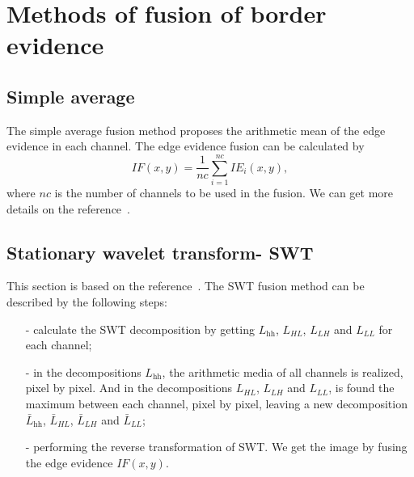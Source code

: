 \documentclass[conference]{IEEEtran}
\begin{document}
\section{Methods of fusion of border evidence}\label{sec_06}
\subsection{Simple average}
The simple average fusion method proposes the arithmetic mean of the edge evidence in each channel. The edge evidence fusion can be calculated by
\begin{equation}
	IF(x,y)=\frac{1}{nc}\sum_{i=1}^{nc}IE_i(x,y),
\end{equation}
where $nc$ is the number of channels to be used in the fusion. We can get more details on the reference~\cite{mit}.
\subsection{Stationary wavelet transform- SWT} 
This section is based on the reference~\cite{n_r}. The SWT fusion method can be described by the following steps:
\begin{itemize}
\item[-] calculate the SWT decomposition by getting $L_\text{hh}$, $L_{HL}$, $L_{LH}$ and $L_{LL}$ for each channel;
\item[-] in the decompositions $L_\text{hh}$, the arithmetic media of all channels is realized, pixel by pixel. And in the decompositions $L_{HL}$, $L_{LH}$ and $L_{LL}$, is found the maximum between each channel, pixel by pixel, leaving a new decomposition $\bar{L}_\text{hh}$, $\bar{L}_{HL}$, $\bar{L}_{LH}$ and $\bar{L}_{LL}$;
\item[-] performing the reverse transformation of SWT. We get the image by fusing the edge evidence $IF(x,y)$.  
\end{itemize}
\end{document}
